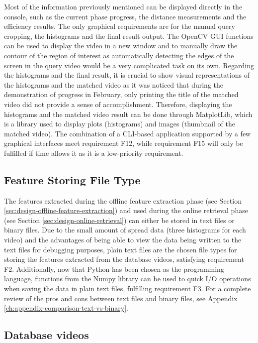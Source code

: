 Most of the information previously mentioned can be displayed directly in the console, such as the current phase progress, the distance measurements and the efficiency results. The only graphical requirements are for the manual query cropping, the histograms and the final result output. The OpenCV GUI functions can be used to display the video in a new window and to manually draw the contour of the region of interest as automatically detecting the edges of the screen in the query video would be a very complicated task on its own. Regarding the histograms and the final result, it is crucial to show visual representations of the histograms and the matched video as it was noticed that during the demonstration of progress in February, only printing the title of the matched video did not provide a sense of accomplishment. Therefore, displaying the histograms and the matched video result can be done through MatplotLib, which is a library used to display plots (histograms) and images (thumbnail of the matched video). The combination of a CLI-based application supported by a few graphical interfaces meet requirement F12, while requirement F15 will only be fulfilled if time allows it as it is a low-priority requirement.

\subsection{Feature Storing File Type}
\label{sec:design-feature-storing-file-type}

The features extracted during the offline feature extraction phase (see Section \ref{sec:design-offline-feature-extraction}) and used during the online retrieval phase (see Section \ref{sec:design-online-retrieval}) can either be stored in text files or binary files. Due to the small amount of spread data (three histograms for each video) and the advantages of being able to view the data being written to the text files for debugging purposes, plain text files are the chosen file types for storing the features extracted from the database videos, satisfying requirement F2. Additionally, now that Python has been chosen as the programming language, functions from the Numpy library can be used to quick I/O operations when saving the data in plain text files, fulfilling requirement F3. For a complete review of the pros and cons between text files and binary files, see Appendix \ref{ch:appendix-comparison-text-vs-binary}.\\

\subsection{Database videos}

